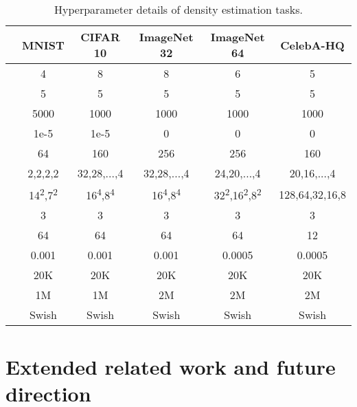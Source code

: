 \documentclass{article}
\begin{document}
\begin{table*}[ht]
\centering
\begin{tabular}{cccccc} 
\toprule
{\bf } & {\bf MNIST} & {\bf CIFAR 10} & {\bf ImageNet 32} & {\bf ImageNet 64} & {\bf CelebA-HQ} \\ 
\midrule
 & 4 & 8 & 8 & 6 & 5\\
 & 5 & 5 & 5 & 5 & 5\\
 & 5000 & 1000 & 1000 & 1000 & 1000\\
 & 1e-5 & 1e-5 & 0 & 0 & 0\\
 & 64 & 160 & 256 & 256 & 160\\
 & 2,2,2,2 & 32,28,...,4 & 32,28,...,4 & 24,20,...,4 & 20,16,...,4\\
 & 14\textsuperscript{2},7\textsuperscript{2} & 16\textsuperscript{4},8\textsuperscript{4} & 16\textsuperscript{4},8\textsuperscript{4} & 32\textsuperscript{2},16\textsuperscript{2},8\textsuperscript{2} & 128,64,32,16,8 \\
 & 3 & 3 & 3 & 3 & 3\\
 & 64 & 64 & 64 & 64 & 12\\
 & 0.001 & 0.001 & 0.001 & 0.0005 & 0.0005\\
 & 20K & 20K & 20K & 20K & 20K\\
 & 1M & 1M & 2M & 2M & 2M\\
 & Swish & Swish & Swish & Swish & Swish\\
\bottomrule
\end{tabular}
\caption{Hyperparameter details of density estimation tasks.}
\label{tab:exp_details}
\end{table*}





\clearpage

\section{Extended related work and future direction}
\label{app:related}
\end{document}
